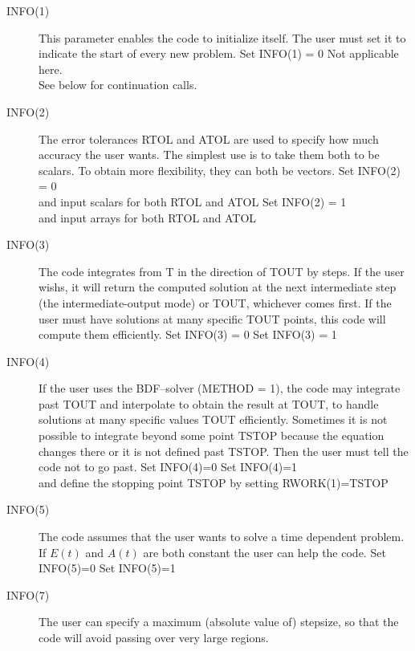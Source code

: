 \begin{description}
\item[INFO(1)] This parameter enables the code to initialize
  itself. The user must set it to indicate the start of every new
  problem.
  {Set INFO(1) = 0}
  {Not applicable here. \\ See below for continuation calls.}
\item[INFO(2)] The error tolerances RTOL and ATOL are used to
  specify how much  accuracy the user wants. The simplest use is to take
  them both to be scalars. To obtain more flexibility, they can both
  be vectors.
  {Set INFO(2) = 0\\and input scalars for both RTOL and ATOL}
  {Set INFO(2) = 1\\and input arrays for both RTOL and ATOL}
\item[INFO(3)] The code integrates from T in the direction of TOUT
  by steps. If the user wishs, it will return the computed solution at
  the next intermediate step (the intermediate-output mode) or
  TOUT, whichever comes first. If the user must have solutions at
  many specific TOUT points, this code will compute them
  efficiently.
  {Set INFO(3) = 0}
  {Set INFO(3) = 1}
\item[INFO(4)] If the user uses the BDF--solver (METHOD = 1), the code may
  integrate past TOUT and interpolate to obtain the result at TOUT, to
  handle solutions at many specific values TOUT efficiently. Sometimes
  it is not possible to integrate beyond some  point TSTOP because the
  equation changes there or it is not defined past TSTOP. Then the user must
  tell the code not to go past.
  {Set INFO(4)=0}
  {Set INFO(4)=1\\
    and define the stopping point TSTOP by setting RWORK(1)=TSTOP}
\item[INFO(5)] The code assumes that the user wants to solve a time
  dependent problem. If $E(t)$ and $A(t)$ are both constant the user
  can help the code.
  {Set INFO(5)=0}
  {Set INFO(5)=1}
\item[INFO(7)] The user can specify a maximum (absolute value of)
  stepsize, so that the code will avoid passing over very large
  regions.

\end{description}
